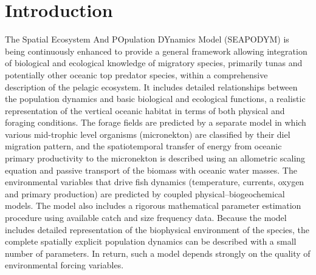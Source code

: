 \chapter*{Introduction}

\setcounter{figure}{0}
\renewcommand{\thefigure}{I.\arabic{figure}}

The Spatial Ecosystem And POpulation DYnamics Model (SEAPODYM) is being continuously enhanced to provide a general framework allowing integration of biological and ecological knowledge of migratory species, primarily tunas and potentially other oceanic top predator species, within a comprehensive description of the pelagic ecosystem. It includes detailed relationships between the population dynamics and basic biological and ecological functions, a realistic representation of the vertical oceanic habitat in terms of both physical and foraging conditions. The forage fields are predicted by a separate model in which various mid-trophic level organisms (micronekton) are classified by their diel migration pattern, and the spatiotemporal transfer of energy from oceanic primary productivity to the micronekton is described using an allometric scaling equation and passive transport of the biomass with oceanic water masses. The environmental variables that drive fish dynamics (temperature, currents, oxygen and primary production) are predicted by coupled physical--biogeochemical models. The model also includes a rigorous mathematical parameter estimation procedure using available catch and size frequency data. Because the model includes detailed representation of the biophysical environment of the species, the complete spatially explicit population dynamics can be described with a small number of parameters. In return, such a model depends strongly on the quality of environmental forcing variables. \\

